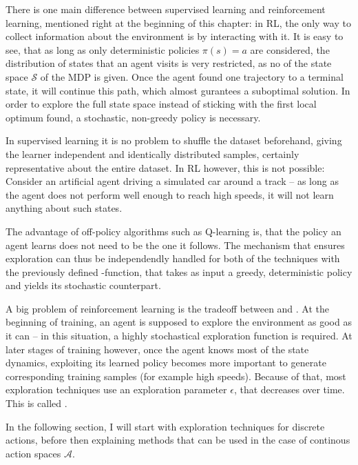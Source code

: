 \label{sec:exploration}

There is one main difference between supervised learning and reinforcement learning, mentioned right at the beginning of this chapter: in RL, the only way to collect information about the environment is by interacting with it. It is easy to see, that as long as only deterministic policies $\pi(s) = a$ are considered, the distribution of states that an agent visits is very restricted, as no  of the state space $\mathcal{S}$ of the MDP is given. Once the agent found one trajectory to a terminal state, it will continue  this path, which almost gurantees a suboptimal solution. In order to explore the full state space instead of sticking with the first local optimum found, a stochastic, non-greedy policy is necessary.

In supervised learning it is no problem to shuffle the dataset beforehand, giving the learner independent and identically distributed samples, certainly representative about the entire dataset. In RL however, this is not possible: Consider an artificial agent driving a simulated car around a track -- as long as the agent does not perform well enough to reach high speeds, it will not learn anything about such states. 

The advantage of off-policy algorithms such as Q-learning is, that the policy an agent learns does not need to be the one it follows. The mechanism that ensures exploration can thus be independendly handled for both of the techniques with the previously defined -function, that takes as input a greedy, deterministic policy and yields its stochastic counterpart.

A big problem of reinforcement learning is the tradeoff between  and . At the beginning of training, an agent is supposed to explore the environment as good as it can -- in this situation, a highly stochastical exploration function is required. At later stages of training however, once the agent knows most of the state dynamics, exploiting its learned policy becomes more important to generate corresponding training samples (for example high speeds). Because of that, most exploration techniques use an exploration parameter $\epsilon$, that decreases over time. This is called .

In the following section, I will start with exploration techniques for discrete actions, before then explaining methods that can be used in the case of continous action spaces $\mathcal{A}$.



